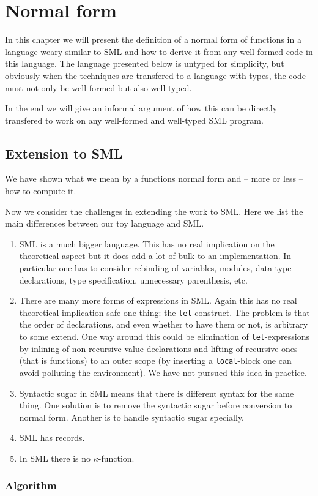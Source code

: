 \chapter{Normal form}

In this chapter we will present the definition of a normal form of functions in
a language weary similar to SML and how to derive it from any well-formed code
in this language. The language presented below is untyped for simplicity, but
obviously when the techniques are transfered to a language with types, the code
must not only be well-formed but also well-typed.

In the end we will give an informal argument of how this can be directly
transfered to work on any well-formed and well-typed SML program.



\section{Extension to SML}

We have shown what we mean by a functions normal form and -- more or less -- how
to compute it.

Now we consider the challenges in extending the work to SML. Here we list the
main differences between our toy language and SML.

\begin{enumerate}
\item SML is a much bigger language. This has no real implication on the
  theoretical aspect but it does add a lot of bulk to an implementation. In
  particular one has to consider rebinding of variables, modules, data type
  declarations, type specification, unnecessary parenthesis, etc.
\item There are many more forms of expressions in SML. Again this has no real
  theoretical implication safe one thing: the \texttt{let}-construct. The
  problem is that the order of declarations, and even whether to have them or
  not, is arbitrary to some extend. One way around this could be elimination of
  \texttt{let}-expressions by inlining of non-recursive value declarations and
  lifting of recursive ones (that is functions) to an outer scope (by inserting
  a \texttt{local}-block one can avoid polluting the environment). We have not
  pursued this idea in practice.
\item Syntactic sugar in SML means that there is different syntax for the same
  thing. One solution is to remove the syntactic sugar before conversion to
  normal form. Another is to handle syntactic sugar specially.
\item SML has records.
\item In SML there is no $\kappa$-function.
\end{enumerate}

\subsection{Algorithm}

